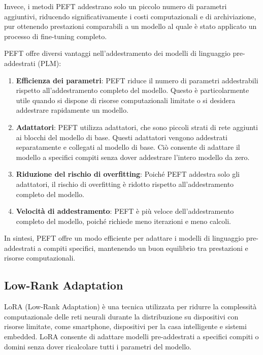 Invece, i metodi PEFT addestrano solo un piccolo numero di parametri aggiuntivi, riducendo significativamente i costi computazionali e di archiviazione, pur ottenendo prestazioni comparabili a un modello al quale è stato applicato un processo di fine-tuning completo.

PEFT offre diversi vantaggi nell’addestramento dei modelli di linguaggio pre-addestrati (PLM):
\begin{enumerate}[label=\alph*.]
    \item   \textbf{Efficienza dei parametri}: PEFT riduce il numero di parametri addestrabili rispetto all’addestramento completo del modello. Questo è particolarmente utile quando si dispone di risorse computazionali limitate o si desidera addestrare rapidamente un modello.
        
    \item  \textbf{Adattatori}: PEFT utilizza adattatori, che sono piccoli strati di rete aggiunti ai blocchi del modello di base. Questi adattatori vengono addestrati separatamente e collegati al modello di base. Ciò consente di adattare il modello a specifici compiti senza dover addestrare l’intero modello da zero.

    \item   \textbf{Riduzione del rischio di overfitting}: Poiché PEFT addestra solo gli adattatori, il rischio di overfitting è ridotto rispetto all’addestramento completo del modello.
    
    \item \textbf{Velocità di addestramento}: PEFT è più veloce dell’addestramento completo del modello, poiché richiede meno iterazioni e meno calcoli.
\end{enumerate}

In sintesi, PEFT offre un modo efficiente per adattare i modelli di linguaggio pre-addestrati a compiti specifici, mantenendo un buon equilibrio tra prestazioni e risorse computazionali.

\subsection{Low-Rank Adaptation}\label{subsec:lora}
LoRA (Low-Rank Adaptation) è una tecnica utilizzata per ridurre la complessità computazionale delle reti neurali durante la distribuzione su dispositivi con risorse limitate, come smartphone, dispositivi per la casa intelligente e sistemi embedded. LoRA consente di adattare modelli pre-addestrati a specifici compiti o domini senza dover ricalcolare tutti i parametri del modello.


